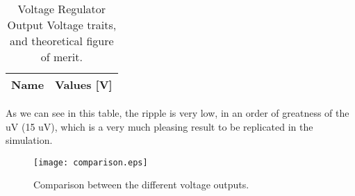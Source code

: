 \begin{table}[h]
  \centering
  \begin{tabular}{|l|r|}
    \hline    
    {\bf Name} & {\bf Values [V]} \\ \hline
     
  \end{tabular}
  \caption{Voltage Regulator Output Voltage traits, and theoretical figure of merit.}
  \label{tab:regula}
\end{table}
As we can see in this table, the ripple is very low, in an order of greatness of the uV (15 uV), which is a very much pleasing result to be replicated in the simulation.

\begin{figure}[h!] \centering
\texttt{[image: comparison.eps]}
\caption{Comparison between the different voltage outputs.}
\label{fig:output}
\end{figure}
\par
